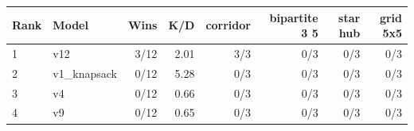 \begin{tabular}{llrrrrrr}
\toprule
Rank & Model & Wins & K/D & corridor & bipartite 3 5 & star hub & grid 5x5 \\
\midrule
1 & v12 & 3/12 & 2.01 & 3/3 & 0/3 & 0/3 & 0/3 \\
2 & v1\_knapsack & 0/12 & 5.28 & 0/3 & 0/3 & 0/3 & 0/3 \\
3 & v4 & 0/12 & 0.66 & 0/3 & 0/3 & 0/3 & 0/3 \\
4 & v9 & 0/12 & 0.65 & 0/3 & 0/3 & 0/3 & 0/3 \\
\bottomrule
\end{tabular}
